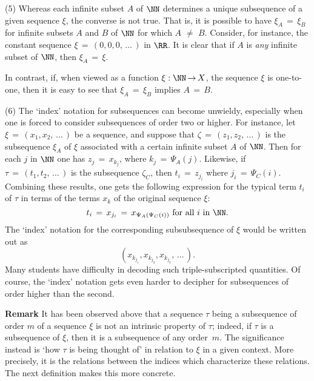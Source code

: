 {\V

        (5) Whereas each infinite subset $A$ of ${\NN}$ determines a unique subsequence of a given sequence ${\xi}$, the converse is not true.
    That is, it is possible to have ${\xi}_{A} \,=\, {\xi}_{B}$  for infinite subsets $A$ and $B$ of ${\NN}$ for which $A \,\,{\neq}\,\, B$.
    Consider, for instance, the constant sequence ${\xi} \,=\, (0,0,0,\,{\ldots}\,)$ in ${\RR}$.
    It is clear that if $A$ is {\em any} infinite subset of ${\NN}$, then ${\xi}_{A} \,=\, {\xi}$.

        In contrast, if, when viewed as a function ${\xi}:{\NN} \,{\rightarrow}\, X$, the sequence ${\xi}$ is one-to-one,
    then it is easy to see that ${\xi}_{A} \,=\, {\xi}_{B}$ implies $A \,=\, B$.

\V

        (6) The `index' notation for subsequences can become unwieldy, especially when one is forced to consider subsequences of order two or higher.
    For instance, let ${\xi} \,=\, (x_{1},x_{2},\,{\ldots}\,)$ be a sequence, 
and suppose that ${\zeta} \,=\, (z_{1},z_{2},\,{\ldots}\,)$ is the subsequence ${\xi}_{A}$ of ${\xi}$ associated with a certain infinite subset $A$ of ${\NN}$.
    Then for each $j$ in ${\NN}$ one has $z_{j} \,=\,x_{k_{j}}$, where $k_{j} \,=\, {\Psi}_{A}(j)$.
    Likewise, if ${\tau} \,=\, (t_{1},t_{2},\,{\ldots}\,)$ is the subsequence ${\zeta}_{C}$, then $t_{i} \,=\, z_{j_{i}}$ where $j_{i} \,=\, {\Psi}_{C}(i)$.
    Combining these results, one gets the following expression for the typical term $t_{i}$ of ${\tau}$ in terms of the terms $x_{k}$ of the original sequence ${\xi}$:
        \begin{displaymath}
        t_{i} \,=\, x_{j_{i}} \,=\, x_{{\Psi}_{A}({\Psi}_{C}(i))} \mbox{ for all $i$ in ${\NN}$}.
        \end{displaymath}
    The `index' notation for the corresponding subsubsequence of ${\xi}$ would be written out as
        \begin{displaymath}
        (x_{k_{j_{1}}}, x_{k_{j_{2}}},x_{k_{j_{3}}},\,{\ldots}\,).
        \end{displaymath}
    Many students have difficulty in decoding such triple-subscripted quantities.
    Of course, the `index' notation gets even harder to decipher for subsequences of order higher than the second.

\VV

        {\bf Remark} It has been observed above that a sequence ${\tau}$ being  a subsequence of order $m$
    of a sequence ${\xi}$ is not an intrinsic property of ${\tau}$; indeed, if ${\tau}$ is a subsequence of ${\xi}$, then it is a subsequence of any order~$m$.
    The significance instead is `how ${\tau}$ is being thought of' in relation to ${\xi}$ in a given context.
    More precisely, it is the relations between the indices which characterize these relations.
    The next definition makes this more concrete.
\VV

}
